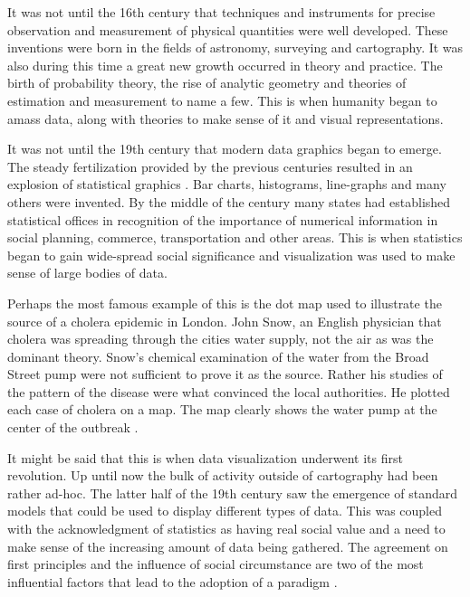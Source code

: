 \documentclass[a4paper, 10pt, titlepage]{article}
\begin{document}
It was not until the 16th century that techniques and instruments for precise observation and measurement of physical quantities were well developed. These inventions were born in the fields of astronomy, surveying and cartography. It was also during this time a great new growth occurred in theory and practice. The birth of probability theory, the rise of analytic geometry and theories of estimation and measurement to name a few. This is when humanity began to amass data, along with theories to make sense of it and visual representations.

It was not until the 19th century that modern data graphics began to emerge. The steady fertilization provided by the previous centuries resulted in an explosion of statistical graphics \cite{friendly2001milestones}. Bar charts, histograms, line-graphs and many others were invented.  By the middle of the century many states had established statistical offices in recognition of the importance of numerical information in social planning, commerce, transportation and other areas. This is when statistics began to gain wide-spread social significance and visualization was used to make sense of large bodies of data. 

Perhaps the most famous example of this is the dot map used to illustrate the source of a cholera epidemic in London. John Snow, an English physician that cholera was spreading through the cities water supply, not the air as was the dominant theory. Snow's chemical examination of the water from the Broad Street pump were not sufficient to prove it as the source. Rather his studies of the pattern of the disease were what convinced the local authorities. He plotted each case of cholera on a map. The map clearly shows the water pump at the center of the outbreak \cite{frerichs2007ghost}.

It might be said that this is when data visualization underwent its first revolution. Up until now the bulk of activity outside of cartography had been rather ad-hoc. The latter half of the 19th century saw the emergence of standard models that could be used to display different types of data. This was coupled with the acknowledgment of statistics as having real social value and a need to make sense of the increasing amount of data being gathered. The agreement on first principles and the influence of social circumstance are two of the most influential factors that lead to the adoption of a paradigm \cite{kuhn1996structure}.
\end{document}
